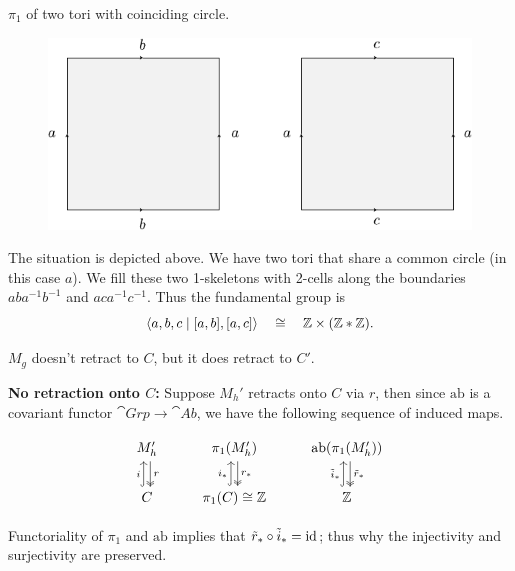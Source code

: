\documentclass[twoside,10pt]{article}
\begin{document}

\begin{exer}[1.2: 8]
$\pi_1$ of two tori with coinciding circle.
\end{exer}

\begin{figure}[H]
	\centering
	\includegraphics[scale=1]{fig/8.pdf}
\end{figure}

The situation is depicted above. We have two tori that share a common circle (in this case $a$). We fill these two 1-skeletons with 2-cells along the boundaries $aba^{-1}b^{-1}$ and $aca^{-1}c^{-1}$. Thus the fundamental group is
\[
	\langle a,b,c \;|\; [a,b], [a,c] \rangle \quad\cong\quad \mathbb{Z} \times (\mathbb{Z} * \mathbb{Z}).
\] 

\newpage

\begin{exer}[1.2: 9]
$M_{g}$ doesn't retract to $C$, but it does retract to $C'$.
\end{exer}

\textbf{No retraction onto $C$:} Suppose $M_{h}'$ retracts onto $C$ via $r$, then since $\text{ab}$ is a covariant functor $\cat{Grp}\to \cat{Ab}$, we have the following sequence of induced maps.

\[
\begin{tikzcd}
	M_{h}' \dar[two heads, shift left]{r} & \pi_1(M_{h}') \dar[two heads, shift left]{r_{*}} & \text{ab}(\pi_1(M_{h}')) \dar[two heads, shift left]{\tilde{r}_{*}} \\
	C \uar[hook, shift left]{i} & \pi_1(C) \cong \mathbb{Z} \uar[hook, shift left]{i_{*}} & \mathbb{Z} \uar[hook, shift left]{\tilde{i}_{*}}
\end{tikzcd}
\] 

Functoriality of $\pi_1$ and $\text{ab}$ implies that $\tilde{r}_{*} \circ \tilde{i}_{*}=\operatorname{id}$; thus why the injectivity and surjectivity are preserved.
\end{document}
